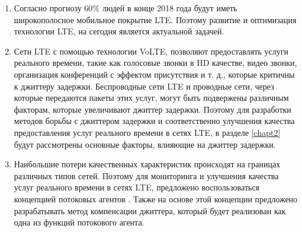 \begin{enumerate}
\item Согласно прогнозу \cite{ericsson} 60\% людей в конце 2018 года будут иметь широкополосное мобильное покрытие LTE. Поэтому развитие и оптимизация технологии LTE, на сегодня является актуальной задачей.

\item Сети LTE с помощью технологии VoLTE, позволяют предоставлять услуги реального времени, такие как голосовые звонки в HD качестве, видео звонки, организация конференций с эффектом присутствия и т. д., которые критичны к джиттеру задержки. Беспроводные сети LTE и проводные сети, через которые передаются пакеты этих услуг, могут быть подвержены различным факторам, которые увеличивают джиттер задержки. Поэтому для разработки методов борьбы с джиттером задержки и соответственно улучшения качества предоставления услуг реального времени в сетях LTE, в разделе \ref{chapt2} будут рассмотрены основные факторы, влияющие на джиттер задержки.


\item Наибольшие потери качественных характеристик происходят на границах различных типов сетей. Поэтому для мониторинга и улучшения качества услуг реального времени в сетях LTE, предложено воспользоваться концепцией потоковых агентов \cite{SAdouble_feedback,SArateOpt,SArealtime}. Также на основе этой концепции предложено разрабатывать метод компенсации джиттера, который будет реализован как одна из функций потокового агента.

\end{enumerate}

\clearpage




